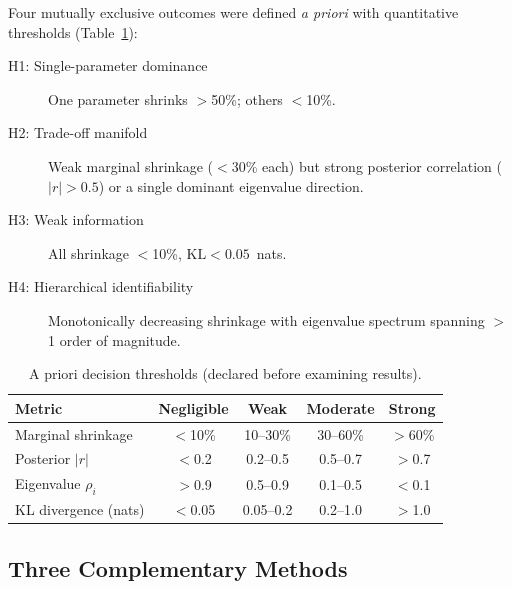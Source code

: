 \documentclass[11pt,a4paper]{article}
\begin{document}
Four mutually exclusive outcomes were defined \emph{a priori} with quantitative
thresholds (Table~\ref{tab:thresholds}):

\begin{description}
\item[H1: Single-parameter dominance] One parameter shrinks $>$50\%; others $<$10\%.
\item[H2: Trade-off manifold] Weak marginal shrinkage ($<$30\% each) but strong
  posterior correlation ($|r| > 0.5$) or a single dominant eigenvalue direction.
\item[H3: Weak information] All shrinkage $<$10\%, $\mathrm{KL} < 0.05$~nats.
\item[H4: Hierarchical identifiability] Monotonically decreasing shrinkage with
  eigenvalue spectrum spanning $>$1 order of magnitude.
\end{description}

\begin{table}[h]
\centering
\caption{A priori decision thresholds (declared before examining results).}
\label{tab:thresholds}
\begin{tabular}{lcccc}
\toprule
Metric & Negligible & Weak & Moderate & Strong \\
\midrule
Marginal shrinkage & $<$10\% & 10--30\% & 30--60\% & $>$60\% \\
Posterior $|r|$ & $<$0.2 & 0.2--0.5 & 0.5--0.7 & $>$0.7 \\
Eigenvalue $\rho_i$ & $>$0.9 & 0.5--0.9 & 0.1--0.5 & $<$0.1 \\
KL divergence (nats) & $<$0.05 & 0.05--0.2 & 0.2--1.0 & $>$1.0 \\
\bottomrule
\end{tabular}
\end{table}

\subsection{Three Complementary Methods}
\end{document}
